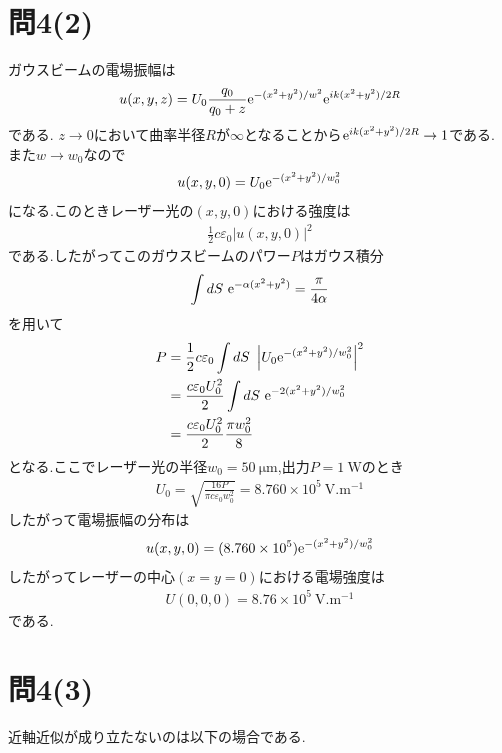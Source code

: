 \documentclass[uplatex,a4j,11pt,dvipdfmx]{jsarticle}
\numberwithin{equation}{section}
\begin{document}
\section*{問4(2)}
ガウスビームの電場振幅は
\begin{align}
  u(x,y,z)=U_0\frac{q_0}{q_0+z}{\rm e}^{-(x^2+y^2)/w^2}{\rm e}^{ik(x^2+y^2)/2R}
\end{align}
である.
$z\rightarrow0$において曲率半径$R$が$\infty$となることから${\rm e}^{ik(x^2+y^2)/2R}\rightarrow 1$である.
また$w\rightarrow w_0$なので
\begin{align}
  u(x,y,0)=U_0{\rm e}^{-(x^2+y^2)/w_0^2}
\end{align}
になる.このときレーザー光の$(x,y,0)$における強度は
\begin{align}
  \frac{1}{2}c\varepsilon_0|u(x,y,0)|^2
\end{align}
である.したがってこのガウスビームのパワー$P$はガウス積分
\begin{align}
  \int dS\ {\rm e}^{-\alpha(x^2+y^2)}=\frac{\pi}{4\alpha}
\end{align}
を用いて
\begin{align}
  \begin{split}
    P&=\frac{1}{2}c\varepsilon_0\int dS\ \left|U_0{\rm e}^{-(x^2+y^2)/w_0^2}\right|^2\\
    &=\frac{c\varepsilon_0U_0^2}{2}\int dS\ {\rm e}^{-2(x^2+y^2)/w_0^2}\\
    &=\frac{c\varepsilon_0U_0^2}{2}\frac{\pi w_0^2}{8}
  \end{split}
\end{align}
となる.ここでレーザー光の半径$w_0=50\ \si{\micro\metre}$,出力$P=1\ \si{\watt}$のとき
\begin{align}
  U_0=\sqrt{\frac{16P}{\pi c\varepsilon_0w_0^2}}=8.760\times10^5\ \si{\volt.\metre^{-1}}
\end{align}
したがって電場振幅の分布は
\begin{align}
  u(x,y,0)=(8.760\times10^5){\rm e}^{-(x^2+y^2)/w_0^2}
\end{align}
したがってレーザーの中心$(x=y=0)$における電場強度は
\begin{align}
  U(0,0,0)=8.76\times10^5\ \si{\volt.\metre^{-1}}
\end{align}
である.
\section*{問4(3)}
近軸近似が成り立たないのは以下の場合である.
\end{document}
